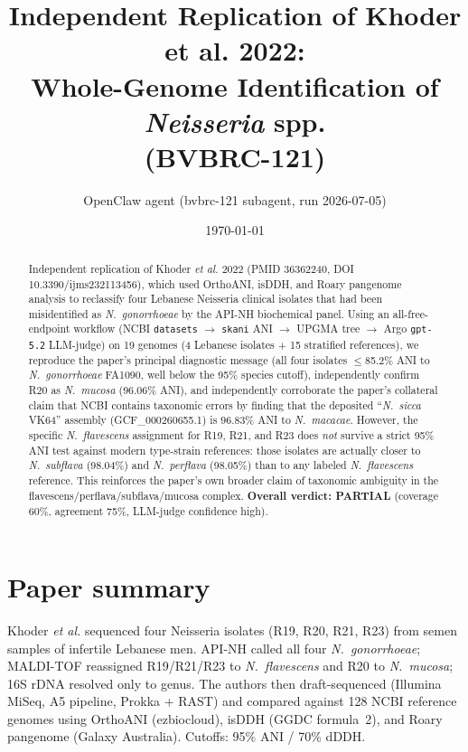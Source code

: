 \documentclass[11pt]{article}
\title{Independent Replication of Khoder et al. 2022:\\ Whole-Genome Identification of \emph{Neisseria} spp.\\ (BVBRC-121)}
\author{OpenClaw agent (bvbrc-121 subagent, run 2026-07-05)}
\date{\today}
\begin{document}
\maketitle

\begin{abstract}
Independent replication of Khoder \emph{et al.} 2022 (PMID 36362240, DOI 10.3390/ijms232113456), which used OrthoANI, isDDH, and Roary pangenome analysis to reclassify four Lebanese Neisseria clinical isolates that had been misidentified as \emph{N.\ gonorrhoeae} by the API-NH biochemical panel. Using an all-free-endpoint workflow (NCBI \texttt{datasets} $\to$ \texttt{skani} ANI $\to$ UPGMA tree $\to$ Argo \texttt{gpt-5.2} LLM-judge) on 19 genomes (4 Lebanese isolates + 15 stratified references), we reproduce the paper's principal diagnostic message (all four isolates $\leq$85.2\% ANI to \emph{N.\ gonorrhoeae} FA1090, well below the 95\% species cutoff), independently confirm R20 as \emph{N.\ mucosa} (96.06\% ANI), and independently corroborate the paper's collateral claim that NCBI contains taxonomic errors by finding that the deposited ``\emph{N.\ sicca} VK64'' assembly (GCF\_000260655.1) is 96.83\% ANI to \emph{N.\ macacae}. However, the specific \emph{N.\ flavescens} assignment for R19, R21, and R23 does \emph{not} survive a strict 95\% ANI test against modern type-strain references: those isolates are actually closer to \emph{N.\ subflava} (98.04\%) and \emph{N.\ perflava} (98.05\%) than to any labeled \emph{N.\ flavescens} reference. This reinforces the paper's own broader claim of taxonomic ambiguity in the flavescens/perflava/subflava/mucosa complex. \textbf{Overall verdict: PARTIAL} (coverage 60\%, agreement 75\%, LLM-judge confidence high).
\end{abstract}

\section{Paper summary}

Khoder \emph{et al.} sequenced four Neisseria isolates (R19, R20, R21, R23) from semen samples of infertile Lebanese men. API-NH called all four \emph{N.\ gonorrhoeae}; MALDI-TOF reassigned R19/R21/R23 to \emph{N.\ flavescens} and R20 to \emph{N.\ mucosa}; 16S rDNA resolved only to genus. The authors then draft-sequenced (Illumina MiSeq, A5 pipeline, Prokka + RAST) and compared against 128 NCBI reference genomes using OrthoANI (ezbiocloud), isDDH (GGDC formula~2), and Roary pangenome (Galaxy Australia). Cutoffs: 95\% ANI / 70\% dDDH.
\end{document}
